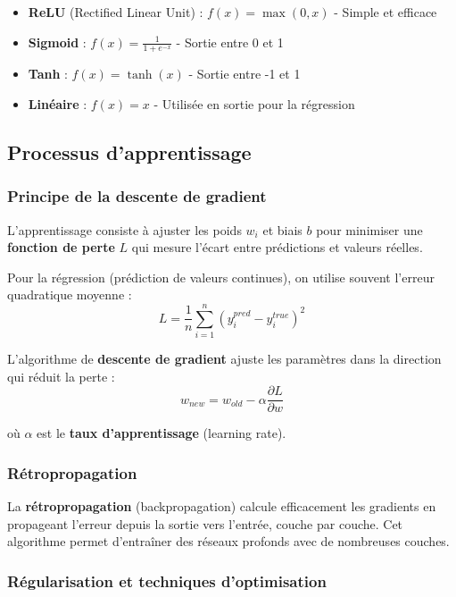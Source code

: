 \documentclass[11pt,a4paper,twocolumn]{article}
\begin{document}
\begin{itemize}
    \item \textbf{ReLU} (Rectified Linear Unit) : $f(x) = \max(0, x)$ - Simple et efficace
    \item \textbf{Sigmoid} : $f(x) = \frac{1}{1 + e^{-x}}$ - Sortie entre 0 et 1
    \item \textbf{Tanh} : $f(x) = \tanh(x)$ - Sortie entre -1 et 1
    \item \textbf{Linéaire} : $f(x) = x$ - Utilisée en sortie pour la régression
\end{itemize}

\subsection{Processus d'apprentissage}

\subsubsection{Principe de la descente de gradient}

L'apprentissage consiste à ajuster les poids $w_i$ et biais $b$ pour minimiser une \textbf{fonction de perte} $L$ qui mesure l'écart entre prédictions et valeurs réelles.

Pour la régression (prédiction de valeurs continues), on utilise souvent l'erreur quadratique moyenne :
$$L = \frac{1}{n}\sum_{i=1}^{n}(y_i^{pred} - y_i^{true})^2$$

L'algorithme de \textbf{descente de gradient} ajuste les paramètres dans la direction qui réduit la perte :
$$w_{new} = w_{old} - \alpha \frac{\partial L}{\partial w}$$

où $\alpha$ est le \textbf{taux d'apprentissage} (learning rate).

\subsubsection{Rétropropagation}

La \textbf{rétropropagation} (backpropagation) calcule efficacement les gradients en propageant l'erreur depuis la sortie vers l'entrée, couche par couche. Cet algorithme permet d'entraîner des réseaux profonds avec de nombreuses couches.

\subsubsection{Régularisation et techniques d'optimisation}
\end{document}
